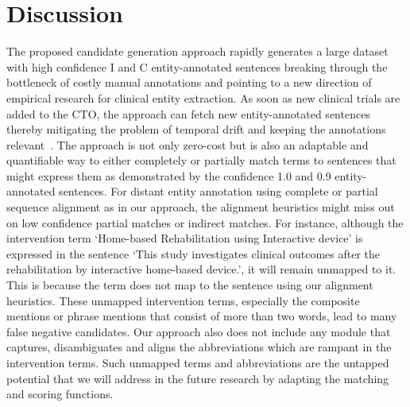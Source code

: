 \documentclass[letterpaper]{article} %
\begin{document}
\section{Discussion}
\label{sec:discussion}
%
The proposed candidate generation approach rapidly generates a large dataset with high confidence I and C entity-annotated sentences breaking through the bottleneck of costly manual annotations and pointing to a new direction of empirical research for clinical entity extraction.
As soon as new clinical trials are added to the CTO, the approach can fetch new entity-annotated sentences thereby mitigating the problem of temporal drift and keeping the annotations relevant~\cite{derczynski2016broad}.
The approach is not only zero-cost but is also an adaptable and quantifiable way to either completely or partially match terms to sentences that might express them as demonstrated by the confidence 1.0 and 0.9 entity-annotated sentences.
For distant entity annotation using complete or partial sequence alignment as in our approach, the alignment heuristics might miss out on low confidence partial matches or indirect matches.
For instance, although the intervention term `Home-based Rehabilitation using Interactive device' is expressed in the sentence `This study investigates clinical outcomes after the rehabilitation by interactive home-based device.', it will remain unmapped to it.
This is because the term does not map to the sentence using our alignment heuristics.
These unmapped intervention terms, especially the composite mentions or phrase mentions that consist of more than two words, lead to many false negative candidates.
Our approach also does not include any module that captures, disambiguates and aligns the abbreviations which are rampant in the intervention terms.
Such unmapped terms and abbreviations are the untapped potential that we will address in the future research by adapting the matching and scoring functions.
\end{document}
